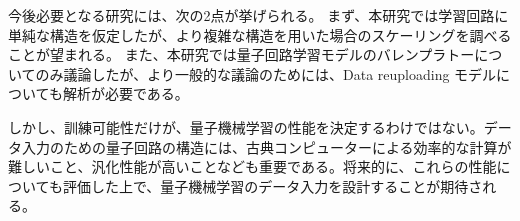今後必要となる研究には、次の2点が挙げられる。
まず、本研究では学習回路に単純な構造を仮定したが、より複雑な構造を用いた場合のスケーリングを調べることが望まれる。
また、本研究では量子回路学習モデルのバレンプラトーについてのみ議論したが、より一般的な議論のためには、Data reuploading モデルについても解析が必要である。

しかし、訓練可能性だけが、量子機械学習の性能を決定するわけではない。データ入力のための量子回路の構造には、古典コンピューターによる効率的な計算が難しいこと、汎化性能が高いことなども重要である。将来的に、これらの性能についても評価した上で、量子機械学習のデータ入力を設計することが期待される。
\restoregeometry